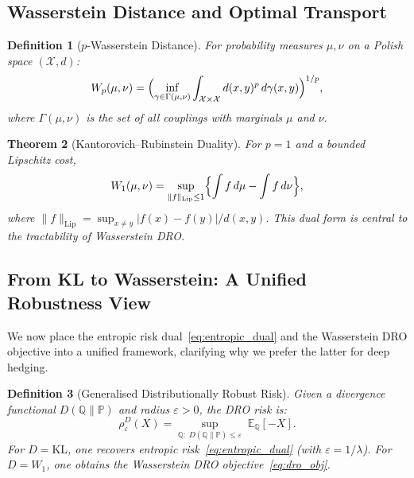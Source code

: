 \documentclass[11pt]{article}
\newtheorem{theorem}{Theorem}[section]
\newtheorem{definition}[theorem]{Definition}
\newcommand{\E}{\mathbb{E}}
\newcommand{\PP}{\mathbb{P}}
\newcommand{\QQ}{\mathbb{Q}}
\begin{document}
\subsection{Wasserstein Distance and Optimal Transport}

\begin{definition}[$p$-Wasserstein Distance]
\label{def:wasserstein}
For probability measures $\mu, \nu$ on a Polish space $(\mathcal{X},d)$:
\begin{equation}
    W_p(\mu, \nu) = \Bigl(\inf_{\gamma \in \Gamma(\mu, \nu)} \int_{\mathcal{X}\times\mathcal{X}} d(x, y)^p \, d\gamma(x,y)\Bigr)^{1/p},
    \label{eq:wasserstein}
\end{equation}
where $\Gamma(\mu, \nu)$ is the set of all couplings with marginals $\mu$ and $\nu$.
\end{definition}

\begin{theorem}[Kantorovich--Rubinstein Duality]
\label{thm:kr}
For $p=1$ and a bounded Lipschitz cost,
\begin{equation}
    W_1(\mu,\nu) = \sup_{\|f\|_{\mathrm{Lip}}\le 1} \Bigl\{\int f\,d\mu - \int f\,d\nu\Bigr\},
    \label{eq:kr}
\end{equation}
where $\|f\|_{\mathrm{Lip}} = \sup_{x\neq y}|f(x)-f(y)|/d(x,y)$.  This dual form is central to the tractability of Wasserstein DRO.
\end{theorem}

\subsection{From KL to Wasserstein: A Unified Robustness View}

We now place the entropic risk dual~\eqref{eq:entropic_dual} and the Wasserstein DRO objective into a unified framework, clarifying why we prefer the latter for deep hedging.

\begin{definition}[Generalised Distributionally Robust Risk]
\label{def:gen_dro}
Given a divergence functional $D(\QQ\|\PP)$ and radius $\varepsilon > 0$, the DRO risk is:
\begin{equation}
    \rho^D_\varepsilon(X) = \sup_{\QQ:\;D(\QQ\|\PP)\le\varepsilon}\;\E_\QQ[-X].
    \label{eq:gen_dro}
\end{equation}
For $D = \mathrm{KL}$, one recovers entropic risk~\eqref{eq:entropic_dual} (with $\varepsilon = 1/\lambda$).  For $D = W_1$, one obtains the Wasserstein DRO objective~\eqref{eq:dro_obj}.
\end{definition}
\end{document}
